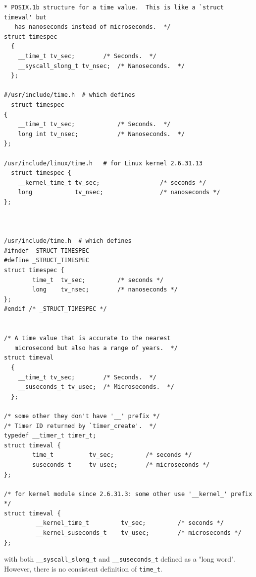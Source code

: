 \begin{verbatim}
* POSIX.1b structure for a time value.  This is like a `struct timeval' but
   has nanoseconds instead of microseconds.  */
struct timespec
  {
    __time_t tv_sec;        /* Seconds.  */
    __syscall_slong_t tv_nsec;  /* Nanoseconds.  */
  };

#/usr/include/time.h  # which defines
  struct timespec
{
    __time_t tv_sec;            /* Seconds.  */
    long int tv_nsec;           /* Nanoseconds.  */
};
  
/usr/include/linux/time.h   # for Linux kernel 2.6.31.13
  struct timespec {
    __kernel_time_t tv_sec;                 /* seconds */
    long            tv_nsec;                /* nanoseconds */
}; 



/usr/include/time.h  # which defines
#ifndef _STRUCT_TIMESPEC
#define _STRUCT_TIMESPEC
struct timespec {
        time_t  tv_sec;         /* seconds */
        long    tv_nsec;        /* nanoseconds */
};
#endif /* _STRUCT_TIMESPEC */


/* A time value that is accurate to the nearest
   microsecond but also has a range of years.  */
struct timeval
  {
    __time_t tv_sec;        /* Seconds.  */
    __suseconds_t tv_usec;  /* Microseconds.  */
  }; 

/* some other they don't have '__' prefix */  
/* Timer ID returned by `timer_create'.  */
typedef __timer_t timer_t;
struct timeval {
        time_t          tv_sec;         /* seconds */
        suseconds_t     tv_usec;        /* microseconds */
};  

/* for kernel module since 2.6.31.3: some other use '__kernel_' prefix */
struct timeval {
         __kernel_time_t         tv_sec;         /* seconds */
         __kernel_suseconds_t    tv_usec;        /* microseconds */
};

\end{verbatim}

with  both \verb!__syscall_slong_t! and \verb!__suseconds_t! defined as a "long
 word". However, there is no consistent definition of \verb!time_t!.


